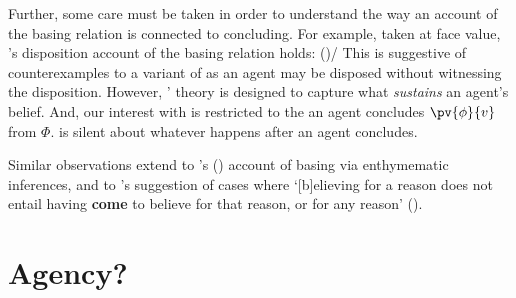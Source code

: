 \begin{note}
{    Further, some care must be taken in order to understand the way an account of the basing relation is connected to concluding.
    For example, taken at face value, \citeauthor{Evans:2013tw}'s disposition account of the basing relation holds:
     (\citeyear[2952]{Evans:2013tw})/
  This is suggestive of counterexamples to a variant of \issueInclusion{} as an agent may be disposed without witnessing the disposition.
  However, \citeauthor{Evans:2013tw}' theory is designed to capture what \emph{sustains} an agent's belief.%
  And, our interest with \issueInclusion{} is restricted to the  an agent concludes \(\pv{\phi}{v}\) from \(\Phi\).
  \issueInclusion{} is silent about whatever happens after an agent concludes.

  Similar observations extend to \citeauthor{Moretti:2019wx}'s (\citeyear{Moretti:2019wx}) account of basing via enthymematic inferences, and to  \citeauthor{Audi:1986to}'s suggestion of cases where `[b]elieving for a reason does not entail having \textbf{come} to believe for that reason, or for any reason' (\citeyear[32--33]{Audi:1986to}).
  }
\end{note}


\section{Agency?}
\label{sec:agency}

